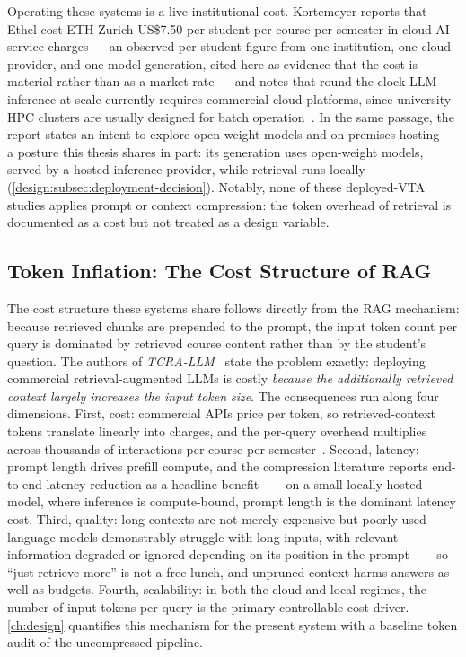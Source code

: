Operating these systems is a live institutional cost. Kortemeyer reports that
Ethel cost ETH Zurich US\$7.50 per student per course per semester in cloud
AI-service charges --- an observed per-student figure from one institution,
one cloud provider, and one model generation, cited here as evidence that the
cost is material rather than as a market rate --- and notes that
round-the-clock LLM inference at scale currently requires commercial cloud
platforms, since university HPC clusters are usually designed for batch
operation~\cite{tpt24:Kortemeyer}. In the same passage, the report states an
intent to explore open-weight models and on-premises hosting --- a posture this thesis shares in part: its generation uses
open-weight models, served by a hosted inference provider, while retrieval
runs locally (\autoref{design:subsec:deployment-decision}). Notably, none of these deployed-VTA studies applies prompt or context
compression: the token overhead of retrieval is documented as a cost but not
treated as a design variable.

\subsection{Token Inflation: The Cost Structure of RAG}
\label{review:subsec:tokens}

The cost structure these systems share follows directly from the RAG
mechanism: because retrieved chunks are prepended to the prompt, the input
token count per query is dominated by retrieved course content rather than by
the student's question. The authors of
\emph{TCRA-LLM}~\cite{femnlp23:Liu} state the
problem exactly: deploying commercial retrieval-augmented LLMs is costly
\emph{because the additionally retrieved context largely increases the input
token size}. The consequences run along four dimensions. First, cost:
commercial APIs price per token, so retrieved-context tokens translate
linearly into charges, and the per-query overhead multiplies across thousands
of interactions per course per semester~\cite{acl25:Kweon,
tpt24:Kortemeyer}. Second, latency: prompt length drives prefill compute, and
the compression literature reports end-to-end latency reduction as a headline
benefit~\cite{acl24:Jiang, facl25:Jeong} --- on a small locally hosted model,
where inference is compute-bound, prompt length is the dominant latency cost.
Third, quality: long contexts are not merely expensive but poorly used ---
language models demonstrably struggle with long inputs, with relevant
information degraded or ignored depending on its position in the
prompt~\cite{tacl24:Liu} --- so \enquote{just retrieve more} is not a free
lunch, and unpruned context harms answers as well as budgets. Fourth,
scalability: in both the cloud and local regimes, the number of input tokens
per query is the primary controllable cost driver. \autoref{ch:design}
quantifies this mechanism for the present system with a baseline token audit
of the uncompressed pipeline.

